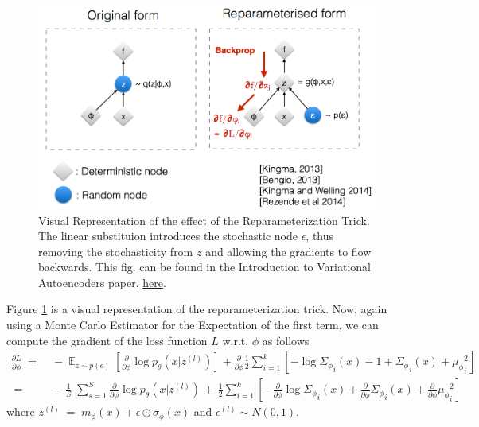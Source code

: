 \documentclass[12pt]{report}
\DeclareMathOperator{\E}{\mathbb{E}}
\begin{document}
\begin{figure}
    \includegraphics[scale=0.35]{reptr.png}   
    \caption{Visual Representation of the effect of the Reparameterization Trick.
             The linear substituion introduces the stochastic node $\epsilon$, thus
             removing the stochasticity from $z$ and allowing the gradients to flow
             backwards. This fig. can be found in the Introduction to Variational
             Autoencoders paper, \href{https://arxiv.org/abs/1906.02691}{here}.}
    \label{fig:RepTrick}
\end{figure}
\bigskip

Figure \ref{fig:RepTrick} is a visual representation of the reparameterization trick.
Now, again using a Monte Carlo Estimator for the Expectation of the first term,
we can compute the gradient of the loss function $L$ w.r.t. $\phi$ as follows
\begin{align*}
    \frac{\partial L}{\partial \phi}
    \;=&\; -\E_{z \sim p(\epsilon)} \left[ \frac{\partial}{\partial \phi}
                \log p_{\theta}(x | z^{(l)}) \right] +
            \frac{\partial}{\partial \phi}
                \frac{1}{2} \sum_{i=1}^k \left[ - \log {\Sigma_{\phi}}_i(x)
                - 1
                + {\Sigma_{\phi}}_i(x)
                + {\mu_{\phi}}_i^2 \right] \\[2ex]
%
    \;=&\; -\frac{1}{S} \;\sum_{s=1}^S \frac{\partial}{\partial \phi}
            \log p_{\theta}(x | z^{(l)}) \,+\,
            \frac{1}{2} \sum_{i=1}^k \left[ -
                \frac{\partial}{\partial \phi} \log {\Sigma_{\phi}}_i(x)
            + \frac{\partial}{\partial \phi} {\Sigma_{\phi}}_i(x)
            + \frac{\partial}{\partial \phi} {\mu_{\phi}}_i^2 \right]
\end{align*}
where $z^{(l)} \;=\; m_{\phi}(x) + \epsilon \odot \sigma_{\phi}(x)$ and
$\epsilon^{(l)} \sim N(0, 1)$.
\clearpage
\end{document}

